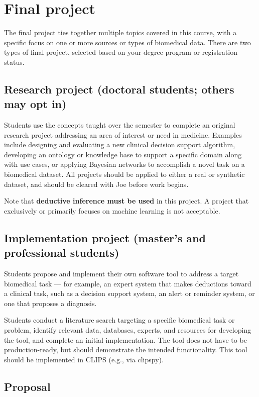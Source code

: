 \documentclass[11pt]{article}
\begin{document}
\section{Final project}

The final project ties together multiple topics covered in this course, with a specific focus on
one or more sources or types of biomedical data. There are two types of final project, selected
based on your degree program or registration status.

\subsection{Research project (doctoral students; others may opt in)}

Students use the concepts taught over the semester to complete an original research project
addressing an area of interest or need in medicine. Examples include designing and evaluating a
new clinical decision support algorithm, developing an ontology or knowledge base to support a
specific domain along with use cases, or applying Bayesian networks to accomplish a novel task on
a biomedical dataset. All projects should be applied to either a real or synthetic dataset, and
should be cleared with Joe before work begins.

Note that \textbf{deductive inference must be used} in this project. A project that exclusively
or primarily focuses on machine learning is not acceptable.

\subsection{Implementation project (master's and professional students)}

Students propose and implement their own software tool to address a target biomedical task ---
for example, an expert system that makes deductions toward a clinical task, such as a decision
support system, an alert or reminder system, or one that proposes a diagnosis.

Students conduct a literature search targeting a specific biomedical task or problem, identify
relevant data, databases, experts, and resources for developing the tool, and complete an initial
implementation. The tool does not have to be production-ready, but should demonstrate the
intended functionality. This tool should be implemented in CLIPS (e.g., via clipspy).

\subsection{Proposal}
\end{document}
